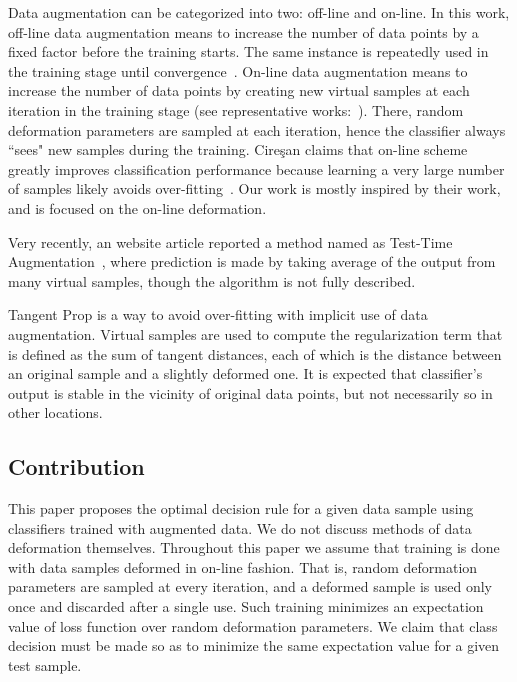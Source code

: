 \documentclass[10pt,twocolumn,letterpaper]{article}
\begin{document}
Data augmentation can be categorized into two: off-line and on-line.
In this work, off-line data augmentation means to increase the number of data points by a fixed factor 
before the training starts.
The same instance is repeatedly used in the training stage until convergence~\cite{Simard03j.c.:best}.
On-line data augmentation means to increase the number of data points 
by creating new virtual samples 
at each iteration in the training stage (see representative works:~\cite{Ciresan:2012b, Ciresan:2010}).
There, random deformation parameters are sampled at each iteration, 
hence the classifier always ``sees" new samples during the training.
Cire{\c s}an \etal claims that on-line scheme greatly improves classification performance
because learning a very large number of samples likely avoids over-fitting~\cite{Ciresan:2012b, Ciresan:2010}.
Our work is mostly inspired by their work, and is focused on the on-line deformation.

Very recently, an website article reported a method named as Test-Time Augmentation~\cite{SanderDieleman},
where prediction is made by taking average of the output from many virtual samples,
though the algorithm is not fully described.

Tangent Prop \cite{560025} is a way to avoid over-fitting with implicit use of data augmentation.
Virtual samples are used to compute the regularization term that is defined as the sum of tangent distances,
each of which is the distance between an original sample and a slightly deformed one.
It is expected that classifier's output is stable in the vicinity of original data points,
but not necessarily so in other locations. 

\subsection{Contribution}

This paper proposes the optimal decision rule for a given data sample using classifiers trained with
augmented data.
We do not discuss methods of data deformation themselves.
Throughout this paper we assume that training is done with data samples deformed in on-line fashion.
That is, random deformation parameters are sampled at every iteration, and a deformed sample is used only once
and discarded after a single use.
Such training minimizes an expectation value of loss function over random deformation parameters.
We claim that class decision must be made so as to minimize the same expectation value for a given test sample.
\end{document}
